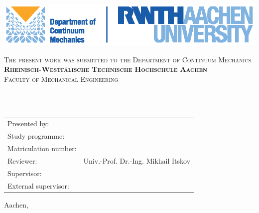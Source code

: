 \begin{titlepage}
	
	\begin{center}
		
		\vspace*{-2cm}
		\begin{minipage}[b]{0.45\textwidth}
		\end{minipage}
		\hfill
		\begin{minipage}[b]{0.45\textwidth}
		\begin{flushright}
					\includegraphics[height=6em]{Style/rwth_km_logo_en.eps}
		\end{flushright}
		\end{minipage}
		
		\normalsize{\scshape{
				The present work was submitted to the Department of Continuum Mechanics}
		}\\[1em]
		\vspace{1cm}
		\normalsize{\scshape\textbf{Rheinisch-Westfälische Technische Hochschule Aachen}}\\
		\normalsize{\normalfont\scshape{Faculty of Mechanical Engineering}}
		
		
		\vspace{2cm}
		
		\Large{\scshape\textbf{\thesistype}}\\[4ex]
		\huge{\scshape\textbf{\titel}}\\[1.5ex]
		
		\vfill{}
		
		\normalsize
		\begin{tabular}{p{5cm}p{8cm}}
			Presented by: 			& \quad  \autor\\[1.2ex]
			Study programme:		& \quad  \studyprogram\\[1.2ex]
			Matriculation number: 	& \quad \matnumber\\[1.2ex]
			Reviewer: 				& \quad Univ.-Prof. Dr.-Ing. Mikhail Itskov\\[1.2ex]
			Supervisor:				& \quad \supervisorinternal \\[1.2ex]
			External supervisor:	& \quad \supervisorexternal \\[1.2ex]
		\end{tabular}
		
		\vspace{3cm}
		
		Aachen, \submitdate
		
		\vspace*{-3.3cm}
		
	\end{center}
	
\end{titlepage}
\newpage
